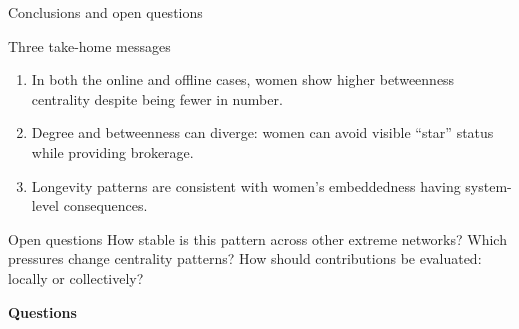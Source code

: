 \begin{frame}{Conclusions and open questions}
  \begin{block}{Three take-home messages}
    \begin{enumerate}
      \item In both the online and offline cases, women show higher \alert{betweenness centrality} despite being fewer in number.
      \item Degree and betweenness can diverge: women can avoid visible “star” status while providing brokerage.
      \item Longevity patterns are consistent with women's embeddedness having system-level consequences.
    \end{enumerate}
  \end{block}

  \begin{exampleblock}{Open questions}
    How stable is this pattern across other extreme networks? Which pressures change centrality patterns? How should contributions be evaluated: locally or collectively?
  \end{exampleblock}

\end{frame}

\begin{frame}[plain]
  \vspace{1.1cm}
  \begin{center}
    {\fontsize{34}{38}\selectfont \textbf{Questions}}
  \end{center}

\end{frame}
